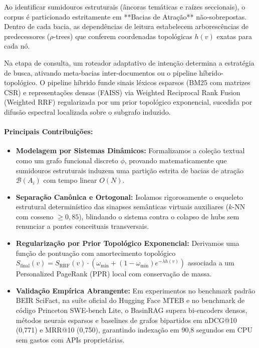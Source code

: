 \documentclass[10pt,twocolumn]{article}
\theoremstyle{definition}
\begin{document}
Ao identificar sumidouros estruturais (âncoras temáticas e raízes seccionais), o corpus é particionado estritamente em **Bacias de Atração** não-sobrepostas. Dentro de cada bacia, as dependências de leitura estabelecem arborescências de predecessores ($\rho$-trees) que conferem coordenadas topológicas $h(v)$ exatas para cada nó.

Na etapa de consulta, um roteador adaptativo de intenção determina a estratégia de busca, ativando meta-bacias inter-documentos ou o pipeline híbrido-topológico. O pipeline híbrido funde sinais léxicos esparsos (BM25 com matrizes CSR) e representações densas (FAISS) via Weighted Reciprocal Rank Fusion (Weighted RRF) regularizada por um prior topológico exponencial, sucedida por difusão espectral localizada sobre o subgrafo induzido.

\paragraph{Principais Contribuições:}
\begin{itemize}
    \item \textbf{Modelagem por Sistemas Dinâmicos:} Formalizamos a coleção textual como um grafo funcional discreto $\phi$, provando matematicamente que sumidouros estruturais induzem uma partição estrita de bacias de atração $\mathcal{B}(A_i)$ com tempo linear $O(N)$.
    \item \textbf{Separação Canônica e Ortogonal:} Isolamos rigorosamente o esqueleto estrutural determinístico das sinapses semânticas virtuais auxiliares ($k$-NN com cosseno $\ge 0,85$), blindando o sistema contra o colapso de hubs sem renunciar a pontes conceituais transversais.
    \item \textbf{Regularização por Prior Topológico Exponencial:} Derivamos uma função de pontuação com amortecimento topológico $S_{\text{final}}(v) = S_{\text{RRF}}(v) \cdot (\omega_{\min} + (1 - \omega_{\min}) e^{-\lambda h(v)})$ associada a um Personalized PageRank (PPR) local com conservação de massa.
    \item \textbf{Validação Empírica Abrangente:} Em experimentos no benchmark padrão BEIR SciFact, na suíte oficial do Hugging Face MTEB e no benchmark de código Princeton SWE-bench Lite, o BasinRAG supera bi-encoders densos, métodos neurais esparsos e baselines de grafos bipartidos em nDCG@10 (0,771) e MRR@10 (0,750), garantindo indexação em 90,8 segundos em CPU sem gastos com APIs proprietárias.
\end{itemize}
\end{document}
